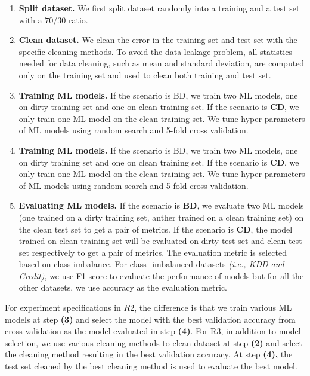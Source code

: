 \begin{enumerate}
	\item {
		\textbf{Split dataset.} We first split dataset randomly into a training
		and a test set with a $70/30$ ratio.
	}
	\item {
		\textbf{Clean dataset.} We clean the error in the training set and test
		set with the specific cleaning methods. To avoid the data
		leakage problem, all statistics needed for data cleaning, such
		as mean and standard deviation, are computed only on the
		training set and used to clean both training and test set.
    }
	\item {
		\textbf{Training ML models.} If the scenario is BD, we train two ML
		models, one on dirty training set and one on clean training
		set. If the scenario is \textbf{CD}, we only train one ML model on the
		clean training set. We tune hyper-parameters of ML models
		using random search and 5-fold cross validation.
	}
	\item {
		\textbf{Training ML models.} If the scenario is BD, we train two ML
		models, one on dirty training set and one on clean training
		set. If the scenario is \textbf{CD}, we only train one ML model on the
		clean training set. We tune hyper-parameters of ML models
		using random search and 5-fold cross validation.
	}
	\item {
		\textbf{Evaluating ML models.} If the scenario is \textbf{BD}, we evaluate
		two ML models (one trained on a dirty training set, anther
		trained on a clean training set) on the clean test set to get
		a pair of metrics. If the scenario is \textbf{CD}, the model trained
		on clean training set will be evaluated on dirty test set and
		clean test set respectively to get a pair of metrics. The evaluation metric is selected based on class imbalance. For class-
		imbalanced datasets \textit{(i.e., KDD and Credit)}, we use F1 score
		to evaluate the performance of models but for all the other
		datasets, we use accuracy as the evaluation metric.
	}
\end{enumerate}

For experiment specifications in $R2$, the difference is that we
train various ML models at step \textbf{(3)} and select the model with the
best validation accuracy from cross validation as the model evaluated in step \textbf{(4)}. 
For R3, in addition to model selection, we use
various cleaning methods to clean dataset at step \textbf{(2)} and select the cleaning method resulting in the best validation accuracy. At step
\textbf{(4),} the test set cleaned by the best cleaning method is used to evaluate the best model.


